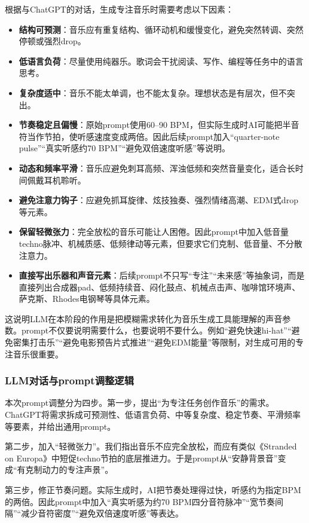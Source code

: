 \documentclass[12pt, fontset=windows]{ctexart}
\begin{document}
根据与ChatGPT的对话，生成专注音乐时需要考虑以下因素：

\begin{itemize}
\item \textbf{结构可预测}：音乐应有重复结构、循环动机和缓慢变化，避免突然转调、突然停顿或强烈drop。
\item \textbf{低语言负荷}：尽量使用纯器乐。歌词会干扰阅读、写作、编程等任务中的语言思考。
\item \textbf{复杂度适中}：音乐不能太单调，也不能太复杂。理想状态是有层次，但不突出。
\item \textbf{节奏稳定且偏慢}：原始prompt使用60--90 BPM，但实际生成时AI可能把半音符当作节拍，使听感速度变成两倍。因此后续prompt加入“quarter-note pulse”“真实听感约70 BPM”“避免双倍速度听感”等说明。
\item \textbf{动态和频率平滑}：音乐应避免刺耳高频、浑浊低频和突然音量变化，适合长时间佩戴耳机聆听。
\item \textbf{避免注意力钩子}：应避免抓耳旋律、炫技独奏、强烈情绪高潮、EDM式drop等元素。
\item \textbf{保留轻微张力}：完全放松的音乐可能让人困倦。因此prompt中加入低音量techno脉冲、机械质感、低频律动等元素，但要求它们克制、低音量、不分散注意力。
\item \textbf{直接写出乐器和声音元素}：后续prompt不只写“专注”“未来感”等抽象词，而是直接列出合成器pad、低频持续音、闷化鼓点、机械点击声、咖啡馆环境声、萨克斯、Rhodes电钢琴等具体元素。
\end{itemize}

这说明LLM在本阶段的作用是把模糊需求转化为音乐生成工具能理解的声音参数。prompt不仅要说明需要什么，也要说明不要什么。例如“避免快速hi-hat”“避免密集打击乐”“避免电影预告片式推进”“避免EDM能量”等限制，对生成可用的专注音乐很重要。

\subsubsection{LLM对话与prompt调整逻辑}

本次prompt调整分为四步。第一步，提出“为专注任务创作音乐”的需求。ChatGPT将需求拆成可预测性、低语言负荷、中等复杂度、稳定节奏、平滑频率等要素，并给出通用prompt。

第二步，加入“轻微张力”。我们指出音乐不应完全放松，而应有类似《Stranded on Europa》中短促techno节拍的底层推进力。于是prompt从“安静背景音”变成“有克制动力的专注声景”。

第三步，修正节奏问题。实际生成时，AI把节奏处理得过快，听感约为指定BPM的两倍。因此prompt中加入“真实听感为约70 BPM四分音符脉冲”“宽节奏间隔”“减少音符密度”“避免双倍速度听感”等表达。
\end{document}
